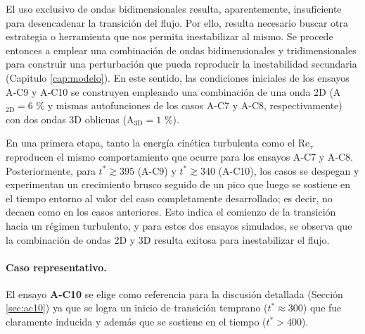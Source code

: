 El uso exclusivo de ondas bidimensionales resulta, aparentemente, insuficiente para desencadenar la transición del flujo. Por ello, resulta necesario buscar otra estrategia o herramienta que nos permita inestabilizar al mismo. Se procede entonces a emplear una combinación de ondas bidimensionales y tridimensionales para construir una perturbación que pueda reproducir la inestabilidad secundaria (Capitulo \ref{cap:modelo}). En este sentido, las condiciones iniciales de los ensayos A‑C9 y A‑C10 se construyen empleando una combinación de una onda 2D (A$_\text{2D}=6$ \% y mismas autofunciones de los casos A-C7 y A-C8, respectivamente) con dos ondas 3D oblicuas (A$_\text{3D}=1$ \%). 

En una primera etapa, tanto la energía cinética turbulenta como el Re$_{\tau}$ reproducen el mismo comportamiento que ocurre para los ensayos A‑C7 y A‑C8. Posteriormente, para $t^* \gtrsim 395$ (A-C9) y $t^* \gtrsim 340$ (A-C10), los casos se despegan y experimentan un crecimiento brusco seguido de un pico que luego se sostiene en el tiempo entorno al valor del caso completamente desarrollado; es decir, no decaen como en los casos anteriores. Esto indica el comienzo de la transición hacia un régimen turbulento, y para estos dos ensayos simulados, se observa que la combinación de ondas 2D y 3D resulta exitosa para inestabilizar el flujo. 

\paragraph{Caso representativo.} El ensayo \textbf{A‑C10} se elige como referencia para la discusión detallada (Sección \ref{sec:ac10}) ya que se logra un inicio de transición temprano ($t^* \approx 300$) que fue claramente inducida y además que se sostiene en el tiempo ($t^*>400$). 

\begin{table}[H]
\centering
\caption{Parámetros de las condiciones iniciales para el caso A (Re$_o$ = 5000, Pr = 0.71, Ri$_b$ = 0.04).}
\label{tab:grupo1}
\end{table}

